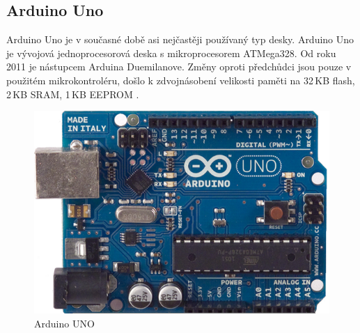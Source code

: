 		\subsection{Arduino Uno} Arduino Uno je v současné době asi nejčastěji používaný typ desky. Arduino Uno je vývojová jednoprocesorová deska s mikroprocesorem ATMega328. Od roku 2011 je nástupcem Arduina Duemilanove. Změny oproti předchůdci jsou pouze v použitém mikrokontroléru, došlo k zdvojnásobení velikosti paměti na 32\,KB flash, 2\,KB SRAM, 1\,KB EEPROM \cite{ArduinoUno}.
		\begin{figure}[!h]
  \begin{center}
    \includegraphics[scale=0.2]{obrazky/emded_arduino_uno}
  \end{center}
  \caption{Arduino UNO \cite{ArduinoUno}}
\end{figure}
	
